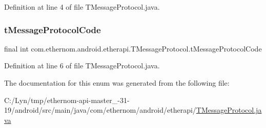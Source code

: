 Definition at line 4 of file T\+Message\+Protocol.\+java.

\mbox{\label{enumcom_1_1ethernom_1_1android_1_1etherapi_1_1_t_message_protocol_af1948ebfe67971c4c4d65b13439e1196}} 
\subsubsection{\texorpdfstring{t\+Message\+Protocol\+Code}{tMessageProtocolCode}}
{\footnotesize\ttfamily final int com.\+ethernom.\+android.\+etherapi.\+T\+Message\+Protocol.\+t\+Message\+Protocol\+Code\hspace{0.3cm}{\ttfamily [private]}}



Definition at line 6 of file T\+Message\+Protocol.\+java.



The documentation for this enum was generated from the following file\+:\begin{DoxyCompactItemize}
\item 
C\+:/\+Lyn/tmp/ethernom-\/api-\/master\+\_-\/31-\/19/android/src/main/java/com/ethernom/android/etherapi/\mbox{\hyperlink{_t_message_protocol_8java}{T\+Message\+Protocol.\+java}}\end{DoxyCompactItemize}

